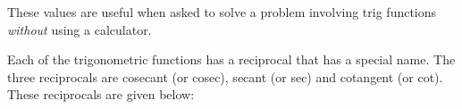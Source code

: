     \par
  
      
      \label{m39408*id81112}These values are useful when asked to solve a problem involving trig functions \textsl{without} using a calculator.\par 
\label{m39408*eip-466}Each of the trigonometric functions has a reciprocal that has a special name. The three reciprocals are cosecant (or cosec), secant (or sec) and cotangent (or cot). These reciprocals are given below:
\label{m39408*eid64932}\nopagebreak\noindent{}
    
